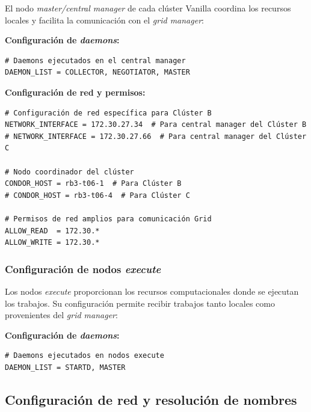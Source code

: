 El nodo \textit{master/central manager} de cada clúster Vanilla coordina los recursos locales y facilita la comunicación con el \textit{grid manager}:

\textbf{Configuración de \textit{daemons}:}

\begin{verbatim}
# Daemons ejecutados en el central manager
DAEMON_LIST = COLLECTOR, NEGOTIATOR, MASTER
\end{verbatim}

\textbf{Configuración de red y permisos:}

\begin{verbatim}
# Configuración de red específica para Clúster B
NETWORK_INTERFACE = 172.30.27.34  # Para central manager del Clúster B
# NETWORK_INTERFACE = 172.30.27.66  # Para central manager del Clúster C

# Nodo coordinador del clúster
CONDOR_HOST = rb3-t06-1  # Para Clúster B
# CONDOR_HOST = rb3-t06-4  # Para Clúster C

# Permisos de red amplios para comunicación Grid
ALLOW_READ  = 172.30.*
ALLOW_WRITE = 172.30.*
\end{verbatim}

\FloatBarrier\subsubsection{Configuración de nodos \textit{execute}}

Los nodos \textit{execute} proporcionan los recursos computacionales donde se ejecutan los trabajos. Su configuración permite recibir trabajos tanto locales como provenientes del \textit{grid manager}:

\textbf{Configuración de \textit{daemons}:}

\begin{verbatim}
# Daemons ejecutados en nodos execute
DAEMON_LIST = STARTD, MASTER
\end{verbatim}

\FloatBarrier\subsection{Configuración de red y resolución de nombres}


